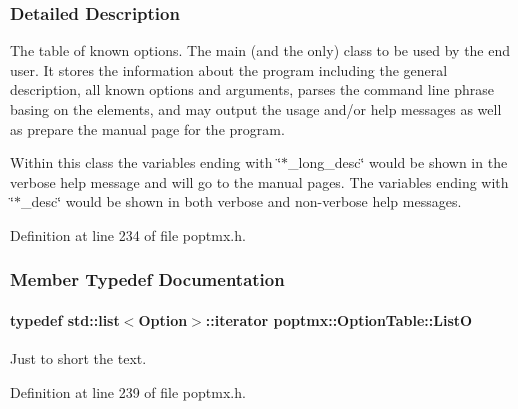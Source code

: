 \subsubsection{Detailed Description}
The table of known options. The main (and the only) class to be used by the end user. It stores the information about the program including the general description, all known options and arguments, parses the command line phrase basing on the elements, and may output the usage and/or help messages as well as prepare the manual page for the program.

Within this class the variables ending with \char`\"{}$\ast$\_\-long\_\-desc\char`\"{} would be shown in the verbose help message and will go to the manual pages. The variables ending with \char`\"{}$\ast$\_\-desc\char`\"{} would be shown in both verbose and non-\/verbose help messages. 

Definition at line 234 of file poptmx.h.



\subsubsection{Member Typedef Documentation}
\hypertarget{classpoptmx_1_1OptionTable_abaa488ce786d8d553d851d225a82d804}{
\paragraph[{ListO}]{\setlength{\rightskip}{0pt plus 5cm}typedef std::list$<${\bf Option}$>$::iterator {\bf poptmx::OptionTable::ListO}}\hfill}
\label{classpoptmx_1_1OptionTable_abaa488ce786d8d553d851d225a82d804}


Just to short the text. 



Definition at line 239 of file poptmx.h.



